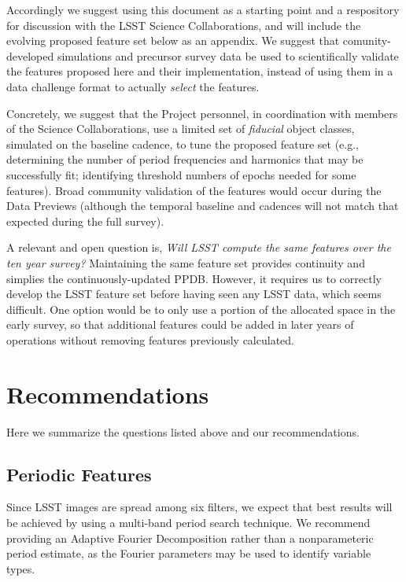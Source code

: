 \documentclass[DM,authoryear,toc]{lsstdoc}
\begin{document}
Accordingly we suggest using this document as a starting point and a respository for discussion with the LSST Science Collaborations, and will include the evolving proposed feature set below as an appendix.
We suggest that comunity-developed simulations and precursor survey data be used to scientifically validate the features proposed here and their implementation, instead of using them in a data challenge format to actually \textit{select} the features.

Concretely, we suggest that the Project personnel, in coordination with members of the Science Collaborations, use a limited set of \textit{fiducial} object classes, simulated on the baseline cadence, to tune the proposed feature set (e.g., determining the number of period frequencies and harmonics that may be successfully fit; identifying threshold numbers of epochs needed for some features).
Broad community validation of the features would occur during the Data Previews (although the temporal baseline and cadences will not match that expected during the full survey).

A relevant and open question is, \textit{Will LSST compute the same features over the ten year survey?}
Maintaining the same feature set provides continuity and simplies the continuously-updated PPDB.
However, it requires us to correctly develop the LSST feature set before having seen any LSST data, which seems difficult.
One option would be to only use a portion of the allocated space in the early survey, so that additional features could be added in later years of operations without removing features previously calculated.

\section{Recommendations}

Here we summarize the questions listed above and our recommendations.

\subsection{Periodic Features}

Since LSST images are spread among six filters, we expect that best results will be achieved by using a multi-band period search technique.
We recommend providing an Adaptive Fourier Decomposition rather than a nonparameteric period estimate, as the Fourier parameters may be used to identify variable types.
\end{document}
